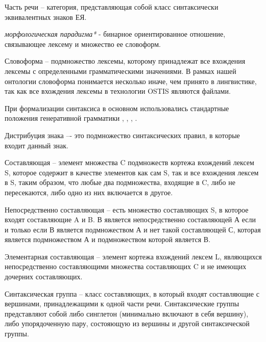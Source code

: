 Часть речи -- категория, представляющая собой класс синтаксически эквивалентных знаков ЕЯ.

\begin{SCn}


\end{SCn}

\textit{морфологическая парадигма*} - бинарное ориентированное отношение, связывающее лексему и множество ее словоформ.

Словоформа -- подмножество лексемы, которому принадлежат все вхождения лексемы с определенными грамматическими значениями.
В рамках нашей онтологии словоформа понимается несколько иначе, чем принято в лингвистике, так как все вхождения лексемы в технологии OSTIS являются файлами.

При формализации синтаксиса в основном использовались стандартные положения генеративной грамматики , , , .

Дистрибуция знака –- это подмножество синтаксических правил, в которые входит данный знак.

Составляющая -- элемент множества C подмножеств кортежа вхождений лексем S, которое содержит в качестве элементов как сам S, так и все вхождения лексем в S, таким образом, что любые два подмножества, входящие в C, либо не пересекаются, либо одно из них включается в другое.

Непосредственно составляющая --  есть множество составляющих S, в которое входят составляющие A и B. В является непосредственно составляющей А если и только если В является подмножеством А и нет такой составляющей С, которая является подмножеством А и подмножеством которой является В.

Элементарная составляющая -- элемент кортежа вхождений лексем L, являющихся непосредственно составляющими множества составляющих C и не имеющих дочерних составляющих.

Синтаксическая группа -- класс составляющих, в который входят составляющие с вершинами, принадлежащими к одной части речи.
Синтаксические группы представляют собой либо синглетон (минимально включают в себя вершину), либо упорядоченную пару, состояющую из вершины и другой синтаксической группы.

